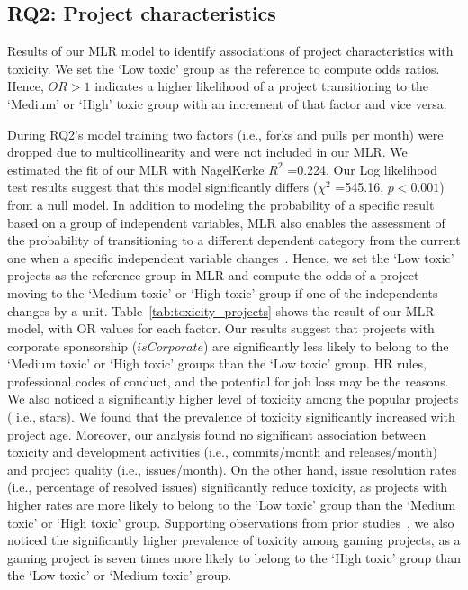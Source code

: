 
\subsection{RQ2: Project characteristics}
\label{sec:rq2}
\begin{table}

    \caption{Results of our MLR model to identify associations of project characteristics with toxicity. We set the `Low toxic' group as the reference to compute odds ratios. Hence, $OR>1$ indicates a higher likelihood of a project transitioning to the `Medium' or `High'  toxic group with an increment of that factor and vice versa. }
    \label{tab:toxicity_projects}
    \centering


\end{table}

During RQ2's model training
two factors (i.e., forks and pulls per month) were dropped due to multicollinearity and were not included in our MLR. We estimated the fit of our MLR with NagelKerke $R^2$ =0.224. Our Log likelihood test results suggest that this model significantly differs ($\chi^2$ =545.16, $p<0.001$) from a null model. 
In addition to modeling the probability of a specific result based on a group of independent variables, MLR also enables the assessment of the probability of transitioning to a different dependent category from the current one when a specific independent variable changes~\cite{bayaga2010multinomial}. Hence, we set the `Low toxic' projects as the reference group in MLR and compute the odds of a project moving to the `Medium toxic' or `High toxic' group if one of the independents changes by a unit.  
Table~\ref{tab:toxicity_projects} shows the result of our MLR model, with OR values for each factor. 
Our results suggest that projects with corporate sponsorship ($isCorporate$) are significantly less likely to belong to the `Medium toxic' or `High toxic' groups than the `Low toxic' group. HR rules, professional codes of conduct, and the potential for job loss may be the reasons. 
We also noticed a significantly higher level of toxicity among the popular projects ( i.e., stars). 
We found that the prevalence of toxicity significantly increased with project age. 
{Moreover, our analysis} found no significant association between toxicity and development activities (i.e., commits/month and releases/month) and project quality (i.e., issues/month). On the other hand, issue resolution rates (i.e., percentage of resolved issues) significantly reduce toxicity, as projects with higher rates are more likely to belong to the `Low toxic' group than the `Medium toxic' or `High toxic' group.
Supporting observations from prior studies~\cite{miller2022did}, we also noticed the significantly higher prevalence of toxicity among gaming projects, as a gaming project is seven times more likely to belong to the `High toxic' group than the `Low toxic' or `Medium toxic' group.




